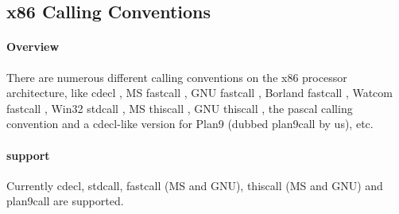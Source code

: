 %
%
%
%

\subsection{x86 Calling Conventions}


\paragraph{Overview}

There are numerous different calling conventions on the x86 processor
architecture, like cdecl \cite{x86cdecl}, MS fastcall \cite{x86Winfastcall}, GNU
fastcall \cite{x86GNUfastcall}, Borland fastcall \cite{x86Borlandfastcall}, Watcom
fastcall \cite{x86Watcomfastcall}, Win32 stdcall \cite{x86Winstdcall}, MS thiscall
\cite{x86Winthiscall}, GNU thiscall \cite{x86GNUthiscall}, the pascal calling
convention \cite{x86Pascal} and a cdecl-like version for Plan9 \cite{x86Plan9}
(dubbed plan9call by us), etc.


\paragraph{ support}

Currently cdecl, stdcall, fastcall (MS and GNU), thiscall (MS and GNU) and
plan9call are supported.\\
\\


